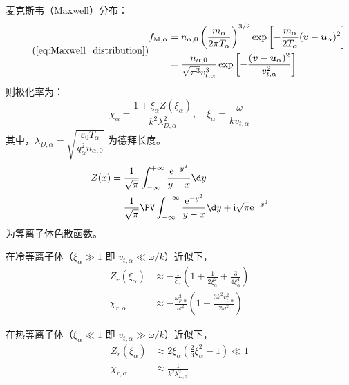 麦克斯韦（Maxwell）分布：
\begin{equation} \tag{\ref{eq:Maxwell_distribution}} \begin{aligned}
f_{\text{M}, \alpha}
&= n_{\alpha, 0} \left(\frac{m_\alpha}{2 \pi T_\alpha}\right)^{3/2}
\exp{\left[- \frac{m_\alpha}{2 T_\alpha} (\vector{v} - \vector{u}_\alpha)^2\right]} \\
&= \frac{n_{\alpha, 0}}{\sqrt{\pi^3} v_{t, \alpha}^3}
\exp{\left[- \frac{(\vector{v} - \vector{u}_\alpha)^2}{v_{t, \alpha}^2}\right]}
\end{aligned}\end{equation}
则极化率为：
\begin{equation}
\chi_\alpha = \frac{1 + \xi_\alpha Z(\xi_\alpha)}{k^2 \lambda_{D,\alpha}^2},
\quad \xi_\alpha = \frac{\omega}{k v_{t,\alpha}}
\end{equation}
其中，$\lambda_{D, \alpha} = \sqrt{\dfrac{\varepsilon_0 T_\alpha}{q_\alpha^2 n_{\alpha, 0}}}$ 为德拜长度。
\begin{equation}\begin{aligned}
Z(x) &= \frac{1}{\sqrt{\pi}} \int_{-\infty}^{+\infty} \frac{\eu^{- y^2}}{y - x} \d y \\
&= \frac{1}{\sqrt{\pi}} \PV \int_{-\infty}^{+\infty} \frac{\eu^{- y^2}}{y - x} \d y
+ \im \sqrt{\pi} \eu^{-x^2}
\end{aligned}\end{equation}
为等离子体色散函数。

在冷等离子体（$\xi_\alpha \gg 1$ 即 $v_{t,\alpha} \ll \omega/k$）近似下，
\begin{subequations}\begin{align}
Z_r(\xi_\alpha) &\approx - \frac{1}{\xi_\alpha} \left(
    1 + \frac{1}{2 \xi_\alpha^2} + \frac{3}{4 \xi_\alpha^4}
\right) \\
\chi_{r, \alpha} &\approx - \frac{\omega_{p,\alpha}^2}{\omega^2} \left(
    1 + \frac{3 k^2 v_{t, \alpha}^2}{2 \omega^2}
\right)
\end{align}\end{subequations}

在热等离子体（$\xi_\alpha \ll 1$ 即 $v_{t,\alpha} \gg \omega/k$）近似下，
\begin{subequations}\begin{align}
Z_r(\xi_\alpha) &\approx 2 \xi_\alpha \left(
    \frac{2}{3} \xi_\alpha^2 - 1
\right) \ll 1 \\
\chi_{r, \alpha} &\approx \frac{1}{k^2 \lambda_{D,\alpha}^2}
\end{align}\end{subequations}


